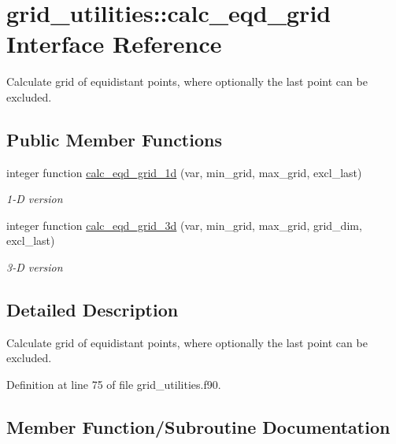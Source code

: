 \hypertarget{interfacegrid__utilities_1_1calc__eqd__grid}{}\section{grid\+\_\+utilities\+:\+:calc\+\_\+eqd\+\_\+grid Interface Reference}
\label{interfacegrid__utilities_1_1calc__eqd__grid}


Calculate grid of equidistant points, where optionally the last point can be excluded.  


\subsection*{Public Member Functions}
\begin{DoxyCompactItemize}
\item 
integer function \hyperlink{interfacegrid__utilities_1_1calc__eqd__grid_a0bae1e5044422ab4275dca4137653386}{calc\+\_\+eqd\+\_\+grid\+\_\+1d} (var, min\+\_\+grid, max\+\_\+grid, excl\+\_\+last)
\begin{DoxyCompactList}\small\item\em 1-\/D version \end{DoxyCompactList}\item 
integer function \hyperlink{interfacegrid__utilities_1_1calc__eqd__grid_a23f66aa71f23875e0e038147663679a2}{calc\+\_\+eqd\+\_\+grid\+\_\+3d} (var, min\+\_\+grid, max\+\_\+grid, grid\+\_\+dim, excl\+\_\+last)
\begin{DoxyCompactList}\small\item\em 3-\/D version \end{DoxyCompactList}\end{DoxyCompactItemize}


\subsection{Detailed Description}
Calculate grid of equidistant points, where optionally the last point can be excluded. 

Definition at line 75 of file grid\+\_\+utilities.\+f90.



\subsection{Member Function/\+Subroutine Documentation}
\mbox{\label{interfacegrid__utilities_1_1calc__eqd__grid_a0bae1e5044422ab4275dca4137653386}} 
